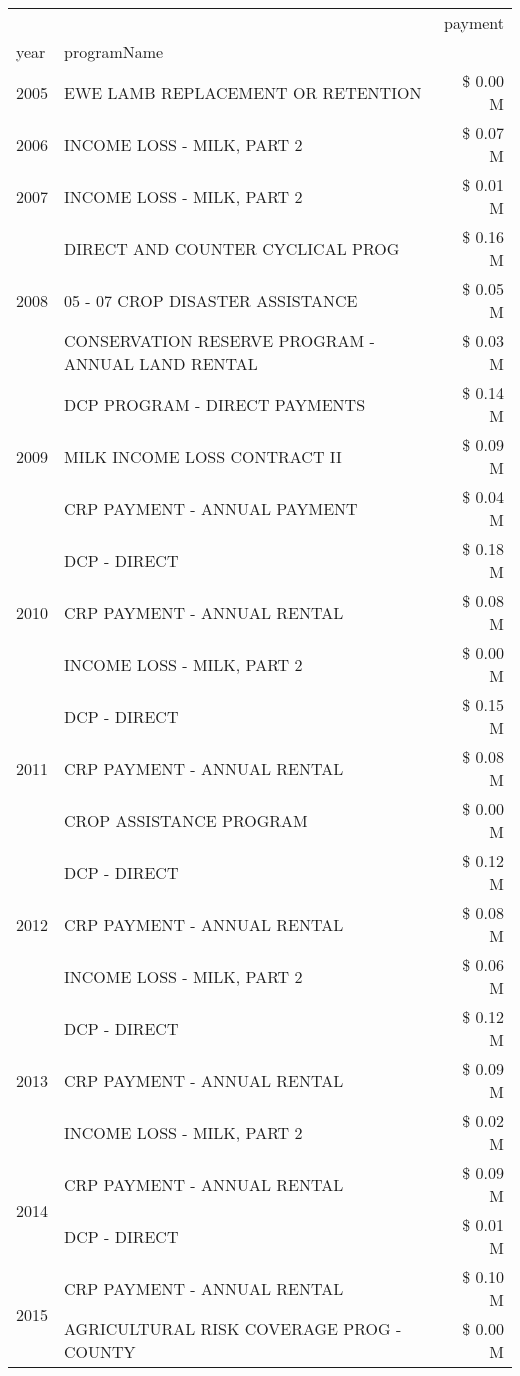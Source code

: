 \begin{tabular}{llr}
\toprule
 &  & payment \\
year & programName &  \\
\midrule
2005 & EWE LAMB REPLACEMENT OR RETENTION & \$ 0.00 M \\
\cline{1-3}
2006 & INCOME LOSS - MILK, PART 2 & \$ 0.07 M \\
\cline{1-3}
2007 & INCOME LOSS - MILK, PART 2 & \$ 0.01 M \\
\cline{1-3}
\multirow[t]{3}{*}{2008} & DIRECT AND COUNTER CYCLICAL PROG & \$ 0.16 M \\
 & 05 - 07 CROP DISASTER ASSISTANCE & \$ 0.05 M \\
 & CONSERVATION RESERVE PROGRAM - ANNUAL LAND RENTAL & \$ 0.03 M \\
\cline{1-3}
\multirow[t]{3}{*}{2009} & DCP PROGRAM - DIRECT PAYMENTS & \$ 0.14 M \\
 & MILK INCOME LOSS CONTRACT II & \$ 0.09 M \\
 & CRP PAYMENT - ANNUAL PAYMENT & \$ 0.04 M \\
\cline{1-3}
\multirow[t]{3}{*}{2010} & DCP - DIRECT & \$ 0.18 M \\
 & CRP PAYMENT - ANNUAL RENTAL & \$ 0.08 M \\
 & INCOME LOSS - MILK, PART 2 & \$ 0.00 M \\
\cline{1-3}
\multirow[t]{3}{*}{2011} & DCP - DIRECT & \$ 0.15 M \\
 & CRP PAYMENT - ANNUAL RENTAL & \$ 0.08 M \\
 & CROP ASSISTANCE PROGRAM & \$ 0.00 M \\
\cline{1-3}
\multirow[t]{3}{*}{2012} & DCP - DIRECT & \$ 0.12 M \\
 & CRP PAYMENT - ANNUAL RENTAL & \$ 0.08 M \\
 & INCOME LOSS - MILK, PART 2 & \$ 0.06 M \\
\cline{1-3}
\multirow[t]{3}{*}{2013} & DCP - DIRECT & \$ 0.12 M \\
 & CRP PAYMENT - ANNUAL RENTAL & \$ 0.09 M \\
 & INCOME LOSS - MILK, PART 2 & \$ 0.02 M \\
\cline{1-3}
\multirow[t]{2}{*}{2014} & CRP PAYMENT - ANNUAL RENTAL & \$ 0.09 M \\
 & DCP - DIRECT & \$ 0.01 M \\
\cline{1-3}
\multirow[t]{2}{*}{2015} & CRP PAYMENT - ANNUAL RENTAL & \$ 0.10 M \\
 & AGRICULTURAL RISK COVERAGE PROG - COUNTY & \$ 0.00 M \\

\end{tabular}
